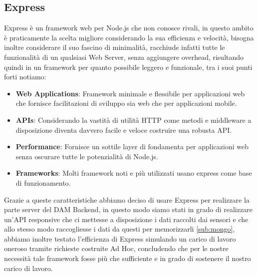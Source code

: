 \documentclass{article}
\begin{document}
\subsection{Express}
Express\cite{express} è un framework web per Node.js che non conosce rivali, in questo ambito è praticamente la scelta migliore considerando la sua efficienza e velocità, bisogna inoltre considerare il suo fascino di minimalità, racchiude infatti tutte le funzionalità di un qualsiasi Web Server, senza aggiungere overhead, risultando quindi in un framework per quanto possibile leggero e funzionale, tra i suoi punti forti notiamo:
\begin{itemize}
	\item \textbf{Web Applications}: Framework minimale e flessibile per applicazioni web che fornisce facilitazioni di sviluppo sia web che per applicazioni mobile.
	\item \textbf{APIs}: Considerando la vastità di utilità HTTP come metodi e middleware a disposizione diventa davvero facile e veloce costruire una robusta API.
	\item \textbf{Performance}: Fornisce un sottile layer di fondamenta per applicazioni web senza oscurare tutte le potenzialità di Node.js.
	\item \textbf{Frameworks}: Molti framework noti e più utilizzati usano express come base di funzionamento.
\end{itemize}
Grazie a queste caratteristiche abbiamo deciso di usare Express per realizzare la parte server del DAM Backend, in questo modo siamo stati in grado di realizzare un'API responsive che ci mettesse a disposizione i dati raccolti dai sensori e che allo stesso modo raccogliesse i dati da questi per memorizzarli \ref{sub:mongo}, abbiamo inoltre testato l'efficienza di Express simulando un carico di lavoro oneroso tramite richieste costruite Ad Hoc, concludendo che per le nostre necessità tale framework fosse più che sufficiente e in grado di sostenere il nostro carico di lavoro.
\end{document}
